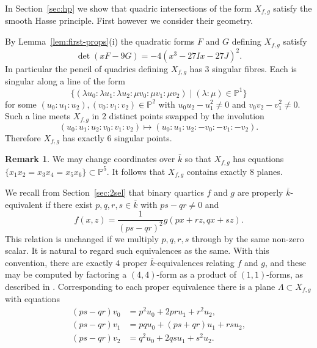 \documentclass[12pt]{amsart}
\newcommand{\PP}{{\mathbb P}}
\newcommand{\kbar}{{\overline k}}
\theoremstyle{definition}
\newtheorem{Remark}[Proposition]{Remark}
\begin{document}
In Section~\ref{sec:hp} we show that quadric intersections of the form
$X_{f,g}$ satisfy the smooth Hasse principle. First however we
consider their geometry.

By Lemma~\ref{lem:first-props}(i) the quadratic forms $F$ and $G$
defining $X_{f,g}$ satisfy
\begin{equation}
  \label{cubic-squared}
  \det(xF - 9G) =  -4(x^3 - 27 I x - 27J)^2.
\end{equation}
In particular the pencil of quadrics defining $X_{f,g}$ has 3 singular
fibres. Each is singular along a line of the form
\[  \{ (\lambda u_0 : \lambda u_1 : \lambda u_2 : \mu v_0 : \mu v_1 : \mu v_2 ) \mid (\lambda:\mu) \in \PP^1 \} \] 
for some $(u_0:u_1:u_2),(v_0:v_1:v_2) \in \PP^2$ with $u_0 u_2 - u_1^2 \not=0$
and $v_0 v_2 - v_1^2 \not=0$.
Such a line meets $X_{f,g}$ in 2 distinct
points swapped by the involution
\begin{equation}
\label{invol}
(u_0:u_1:u_2:v_0:v_1:v_2) \mapsto (u_0:u_1:u_2:-v_0:-v_1:-v_2).
\end{equation}
Therefore $X_{f,g}$ has exactly $6$ singular points.

\begin{Remark}
\label{rem:8planes}
We may change coordinates over $\kbar$ so that $X_{f,g}$ has equations
$\{ x_1 x_2 = x_3 x_4 = x_5 x_6 \} \subset \PP^5$.  It follows that
$X_{f,g}$ contains exactly $8$ planes.
\end{Remark}  

We recall from Section~\ref{sec:2sel} that binary quartics $f$ and $g$
are properly $\kbar$-equivalent if there exist $p,q,r,s \in \kbar$
with $ps-qr \not=0$ and
\[ f(x,z) = \frac{1}{(ps-qr)^2} g(px + rz,qx+sz). \]
This relation is unchanged if we multiply $p,q,r,s$ through by the
same non-zero scalar. It is natural to regard such equivalences as the
same.  With this convention, there are exactly $4$ proper
$\kbar$-equivalences relating $f$ and $g$, and these may be computed
by factoring a $(4,4)$-form as a product of $(1,1)$-forms, as
described in \cite[Theorem 12]{CF}.  Corresponding to each proper
equivalence there is a plane $\Lambda \subset X_{f,g}$ with equations
\begin{align*}
  (ps - qr) v_0 &= p^2 u_0 + 2pr u_1 + r^2 u_2, \\
  (ps - qr) v_1 &= pq u_0 + (ps +qr) u_1 + rs u_2,\\
  (ps - qr) v_2 &= q^2 u_0 + 2qs u_1 + s^2 u_2.
\end{align*}
\end{document}
